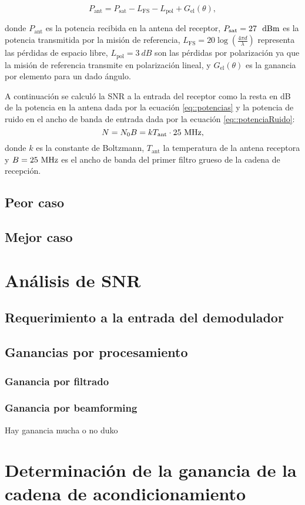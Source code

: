 \documentclass[../../main.tex]{subfiles}
\begin{document}
\begin{equation}
    P_\textrm{ant} = P_\textrm{sat} - L_\textrm{FS} - L_\textrm{pol} + G_\textrm{el} (\theta),
    \label{eq::potencias}
\end{equation}

donde $P_\textrm{ant}$ es la potencia recibida en la antena del receptor, $P_\textrm{sat} = 27~~\textrm{dBm}$ es la potencia transmitida por la misión de referencia, $L_\textrm{FS} = 20 \log \left(\frac{4 \pi d}{\lambda}\right)$ representa las pérdidas de espacio libre, $L_\textrm{pol} = 3~dB$ son las pérdidas por polarización ya que la misión de referencia transmite en polarización lineal, y $G_\textrm{el} (\theta)$ es la ganancia por elemento para un dado ángulo.

A continuación se calculó la SNR a la entrada del receptor como la resta en dB de la potencia en la antena dada por la ecuación \ref{eq::potencias} y la potencia de ruido en el ancho de banda de entrada dada por la ecuación \ref{eq::potenciaRuido}:
\begin{equation}
    N = N_0 B = k T_\textrm{ant} \cdot 25~\textrm{MHz},
    \label{eq::potenciaRuido}
\end{equation}
donde $k$ es la constante de Boltzmann, $T_\textrm{ant}$ la temperatura de la antena receptora y $B = 25~\textrm{MHz}$ es el ancho de banda del primer filtro grueso de la cadena de recepción.
\subsection{Peor caso}
\subsection{Mejor caso}

\section{Análisis de SNR}
\subsection{Requerimiento a la entrada del demodulador}
\subsection{Ganancias por procesamiento}
\subsubsection{Ganancia por filtrado}
\subsubsection{Ganancia por beamforming}
Hay ganancia mucha o no duko
\section{Determinación de la ganancia de la cadena de acondicionamiento}
\end{document}
